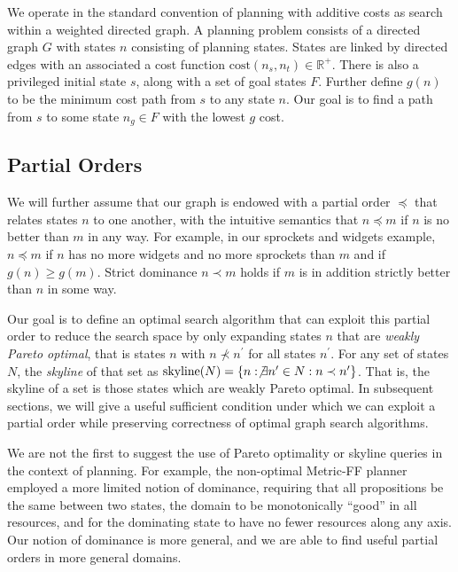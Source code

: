\documentclass[letterpaper]{article}
\theoremstyle{plain} \newtheorem{theorem}{Theorem} \newtheorem{proposition}{Proposition} \newtheorem{lemma}{Lemma}
\theoremstyle{definition} \newtheorem{definition}{Definition} \newtheorem{conjecture}{Conjecture} \newtheorem*{example}{Example}
\theoremstyle{remark} \newtheorem*{remark}{Remark} \newtheorem*{note}{Note} \newtheorem{case}{Case}
\begin{document}
We operate in the standard convention of planning with additive
costs as search within a weighted directed graph.  A planning problem
consists of a directed graph $G$ with states $n$ consisting of
planning states.  States are linked by directed edges with an
associated a cost function $\mathrm{cost}(n_s,n_t) \in \mathbb R^+$.
There is also a privileged initial state $s$, along with a set of
goal states $F$.  Further define $g(n)$ to be the minimum cost path
from $s$ to any state $n$.  Our goal is to find a path from $s$ to
some state $n_g \in F$ with the lowest $g$ cost.


\subsection{Partial Orders}

We will further assume that our graph is endowed with a partial order $\preceq$
that relates states $n$ to one another, with the intuitive semantics that
$n \preceq m$ if $n$ is no better than $m$ in any way. For example, in
our sprockets and widgets example, $n \preceq m$ if $n$ has no more widgets and
no more sprockets than $m$ and if $g(n) \ge g(m)$. Strict dominance $n \prec m$
holds if $m$ is in addition strictly better than $n$ in some way.

Our goal is to define an optimal search algorithm that can exploit
this partial order to reduce the search space by only expanding
states $n$ that are \textit{weakly Pareto optimal}, that is states
$n$ with $n \nprec n^\prime$ for all states $n^\prime$. For any set
of states $N$, the \textit{skyline} of that set as
$\textrm{skyline}(N)=\{n: \not\exists n^\prime \in N: n \prec
n^\prime\}$. That is, the skyline of a set is those states which
are weakly Pareto optimal.  In subsequent sections, we will give a
useful sufficient condition under which we can exploit a partial
order while preserving correctness of optimal graph search algorithms.

We are not the first to suggest the use of Pareto optimality or
skyline queries in the context of planning. For example, the
non-optimal Metric-FF planner~\citep{hoffmann2003metric} employed a
more limited notion of dominance, requiring that all propositions
be the same between two states, the domain to be monotonically
``good'' in all resources, and for the dominating state to have no
fewer resources along any axis. Our notion of dominance is more
general, and we are able to find useful partial orders in more general
domains.
\end{document}
